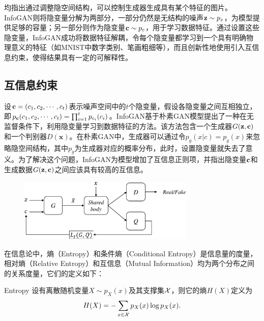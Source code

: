 \citet{mirza2014conditional,odena2017conditional,miyato2018cgans}均指出通过调整隐空间结构，可以控制生成器生成具有某个特征的图片。InfoGAN\citep{chen2016infogan}则将隐变量分解为两部分，一部分仍然是无结构的噪声$\mathbf{z} \sim p_z$，为模型提供足够的容量；另一部分则作为隐变量$\mathbf{c} \sim p_c$，用于学习数据特征。通过设置这些隐变量，InfoGAN成功将数据特征解耦，令每个隐变量都学习到一个具有明确物理意义的特征（如MNIST中数字类别、笔画粗细等），而且创新性地使用引入互信息约束，使得结果具有一定的可解释性。

\subsection{互信息约束}
设$\mathbf{c} = (c_1, c_2, \cdots, c_t)$表示噪声空间中的$t$个隐变量，假设各隐变量之间互相独立，即$p_{\mathbf{c}}(c_1, c_2, \cdots, c_t) = \prod_{i=1}^t p_{c_i}(c_i)$。InfoGAN基于朴素GAN模型提出了一种在无监督条件下，利用隐变量学习到数据特征的方法。该方法包含一个生成器$G(\mathbf{z}, \mathbf{c})$和一个判别器$D(\mathbf{x})$。在朴素GAN中，生成器可以通过令$p_g(x|c) = p_g(x)$来忽略隐空间结构，其中$p_g$为生成器对应的概率分布，此时，设置隐变量就失去了意义。为了解决这个问题，InfoGAN为模型增加了互信息正则项，并指出隐变量$\mathbf{c}$和生成数据$G(\mathbf{z}, \mathbf{c})$之间应该具有较高的互信息。
\begin{figure}[hbtp]
  \centering
  \includegraphics[width=0.75\textwidth]{Img/arch-infogan.pdf}
  \label{fig:arch-infogan}
\end{figure}

在信息论中，熵（Entropy）和条件熵（Conditional Entropy）是信息量的度量，相对熵（Relative Entropy）和互信息（Mutual Information）均为两个分布之间的关系度量，它们的定义如下\citep{cover2012elements}：

\begin{definition}{Entropy}
  设有离散随机变量$X \sim p_X(x)$及其支撑集$\mathcal{X}$，则它的熵$H(X)$定义为
  \begin{equation}
    H(X) = -\sum_{x\in\mathcal{X}} p_X(x) \log p_X(x).
  \end{equation}
  \label{def:entropy}
\end{definition}

